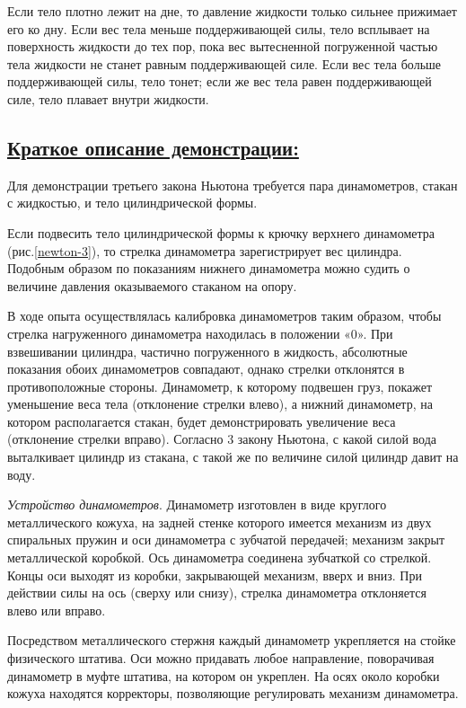 \documentclass[14pt,a4paper,oneside]{extarticle}	%
\begin{document}
Если тело плотно лежит на дне, то давление жидкости только сильнее прижимает его ко дну. 
Если вес тела меньше поддерживающей силы, тело всплывает на поверхность жидкости до тех пор, пока вес вытесненной погруженной частью тела жидкости не станет равным поддерживающей силе. 
Если вес тела больше поддерживающей силы, тело тонет; если же вес тела равен поддерживающей силе, тело плавает внутри жидкости.

\newpage
\subsection*{\underline{Краткое описание демонстрации:}}

Для демонстрации третьего закона Ньютона требуется пара динамометров, стакан с жидкостью, и тело цилиндрической формы.

Если подвесить тело цилиндрической формы к крючку верхнего динамометра (рис.\ref{newton-3}), то стрелка динамометра зарегистрирует вес цилиндра.
Подобным образом по показаниям нижнего динамометра можно судить о величине давления оказываемого стаканом на опору.

В ходе опыта осуществлялась калибровка динамометров таким образом, чтобы стрелка нагруженного динамометра находилась в положении «0».
При взвешивании цилиндра, частично погруженного в жидкость, абсолютные показания обоих динамометров совпадают, однако стрелки отклонятся в противоположные стороны.
Динамометр, к которому подвешен груз, покажет уменьшение веса тела (отклонение стрелки влево), а нижний динамометр, на котором располагается стакан, будет демонстрировать увеличение веса (отклонение стрелки вправо). Согласно 3 закону Ньютона, с какой силой вода выталкивает цилиндр из стакана, с такой же по величине силой цилиндр давит на воду.  

\textit{Устройство динамометров}. Динамометр изготовлен в виде круглого металлического кожуха, на задней стенке которого имеется механизм из двух спиральных пружин и оси динамометра с зубчатой передачей; механизм закрыт металлической коробкой.
Ось динамометра соединена зубчаткой со стрелкой. 
Концы оси выходят из коробки, закрывающей механизм, вверх и вниз.
При действии силы на ось (сверху или снизу), стрелка динамометра отклоняется влево или вправо.

Посредством металлического стержня каждый динамометр укрепляется на стойке физического штатива.
Оси можно придавать любое направление, поворачивая динамометр в муфте штатива, на котором он укреплен.
На осях около коробки кожуха находятся корректоры, позволяющие регулировать механизм динамометра.
\end{document}

